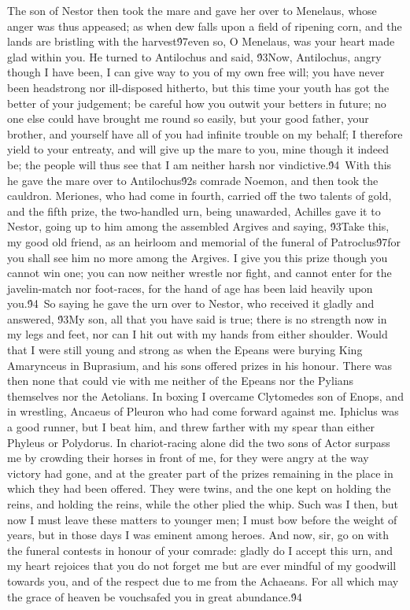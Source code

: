 {The son of Nestor then took the mare and gave her over to Menelaus, whose anger was thus appeased; as when dew falls upon a field of ripening corn, and the lands are bristling with the harvest\'97even so, O Menelaus, was your heart made glad within you. He turned to Antilochus and said, \'93Now, Antilochus, angry though I have been, I can give way to you of my own free will; you have never been headstrong nor ill-disposed hitherto, but this time your youth has got the better of your judgement; be careful how you outwit your betters in future; no one else could have brought me round so easily, but your good father, your brother, and yourself have all of you had infinite trouble on my behalf; I therefore yield to your entreaty, and will give up the mare to you, mine though it indeed be; the people will thus see that I am neither harsh nor vindictive.\'94\
With this he gave the mare over to Antilochus\'92s comrade Noemon, and then took the cauldron. Meriones, who had come in fourth, carried off the two talents of gold, and the fifth prize, the two-handled urn, being unawarded, Achilles gave it to Nestor, going up to him among the assembled Argives and saying, \'93Take this, my good old friend, as an heirloom and memorial of the funeral of Patroclus\'97for you shall see him no more among the Argives. I give you this prize though you cannot win one; you can now neither wrestle nor fight, and cannot enter for the javelin-match nor foot-races, for the hand of age has been laid heavily upon you.\'94\
So saying he gave the urn over to Nestor, who received it gladly and answered, \'93My son, all that you have said is true; there is no strength now in my legs and feet, nor can I hit out with my hands from either shoulder. Would that I were still young and strong as when the Epeans were burying King Amarynceus in Buprasium, and his sons offered prizes in his honour. There was then none that could vie with me neither of the Epeans nor the Pylians themselves nor the Aetolians. In boxing I overcame Clytomedes son of Enops, and in wrestling, Ancaeus of Pleuron who had come forward against me. Iphiclus was a good runner, but I beat him, and threw farther with my spear than either Phyleus or Polydorus. In chariot-racing alone did the two sons of Actor surpass me by crowding their horses in front of me, for they were angry at the way victory had gone, and at the greater part of the prizes remaining in the place in which they had been offered. They were twins, and the one kept on holding the reins, and holding the reins, while the other plied the whip. Such was I then, but now I must leave these matters to younger men; I must bow before the weight of years, but in those days I was eminent among heroes. And now, sir, go on with the funeral contests in honour of your comrade: gladly do I accept this urn, and my heart rejoices that you do not forget me but are ever mindful of my goodwill towards you, and of the respect due to me from the Achaeans. For all which may the grace of heaven be vouchsafed you in great abundance.\'94\
}

